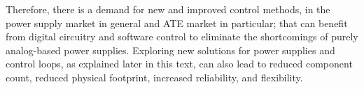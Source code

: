 Therefore, there is a demand for new and improved control methods,
in the power supply market in general and ATE market in particular;
that can benefit from digital circuitry and software control to eliminate the
shortcomings of purely analog-based power supplies.
Exploring new solutions for power supplies and control loops, as explained later
in this text, can also lead to reduced component count, reduced physical
footprint, increased reliability, and flexibility.
